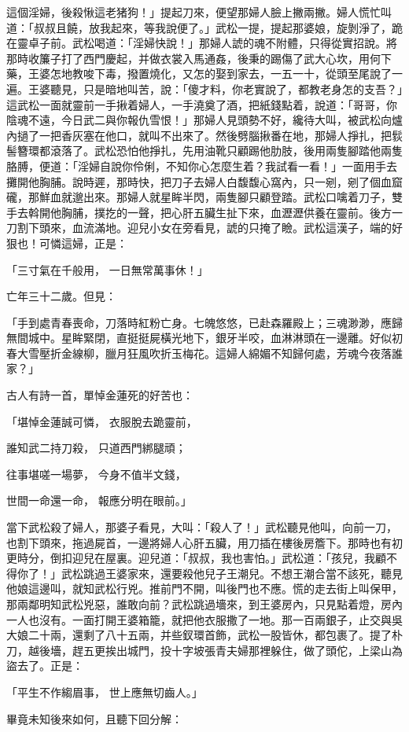 這個淫婦，後殺愀這老猪狗！」提起刀來，便望那婦人臉上撇兩撇。婦人慌忙叫道：「叔叔且饒，放我起來，等我說便了。」武松一提，提起那婆娘，旋剝淨了，跪在靈卓子前。武松喝道：「淫婦快說！」那婦人諕的魂不附體，只得從實招說。將那時收簾子打了西門慶起，并做衣裳入馬通姦，後秉的踢傷了武大心坎，用何下藥，王婆怎地教唆下毒，撥置燒化，又怎的娶到家去，一五一十，從頭至尾說了一遍。王婆聽見，只是暗地叫苦，說：「傻才料，你老實說了，都教老身怎的支吾？」這武松一面就靈前一手揪着婦人，一手澆奠了酒，把紙錢點着，說道：「哥哥，你陰魂不遠，今日武二與你報仇雪恨！」那婦人見頭勢不好，纔待大叫，被武松向爐內撾了一把香灰塞在他口，就叫不出來了。然後劈腦揪番在地，那婦人掙扎，把䯼髻簪環都滾落了。武松恐怕他掙扎，先用油靴只顧踢他肋肢，後用兩隻腳踏他兩隻胳膊，便道：「淫婦自說你伶俐，不知你心怎麼生着？我試看一看！」一面用手去攤開他胸脯。說時遲，那時快，把刀子去婦人白馥馥心窩內，只一剜，剜了個血窟礲，那鮮血就邈出來。那婦人就星眸半閃，兩隻腳只顧登踏。武松口噙着刀子，雙手去斡開他胸脯，撲扢的一聲，把心肝五臟生扯下來，血瀝瀝供養在靈前。後方一刀割下頭來，血流滿地。迎兒小女在旁看見，諕的只掩了瞼。武松這漢子，端的好狠也！可憐這婦，正是：

「三寸氣在千般用，  一日無常萬事休！」

亡年三十二歲。但見：

「手到處青春喪命，刀落時紅粉亡身。七魄悠悠，已赴森羅殿上；三魂渺渺，應歸無間城中。星眸緊閉，直挺挺屍橫光地下，銀牙半咬，血淋淋頭在一邊離。好似初春大雪壓折金線柳，臘月狂風吹折玉梅花。這婦人綿媚不知歸何處，芳魂今夜落誰家？」

古人有詩一首，單悼金蓮死的好苦也：

「堪悼金蓮誠可憐，  衣服脫去跪靈前，

誰知武二持刀殺，  只道西門綁腿頑；

往事堪嗟一場夢，  今身不值半文錢，

世間一命還一命，  報應分明在眼前。」

當下武松殺了婦人，那婆子看見，大叫：「殺人了！」武松聽見他叫，向前一刀，也割下頭來，拖過屍首，一邊將婦人心肝五臟，用刀插在樓後房簷下。那時也有初更時分，倒扣迎兒在屋裏。迎兒道：「叔叔，我也害怕。」武松道：「孩兒，我顧不得你了！」武松跳過王婆家來，還要殺他兒子王潮兒。不想王潮合當不該死，聽見他娘這邊叫，就知武松行兇。推前門不開，叫後門也不應。慌的走去街上叫保甲，那兩鄰明知武松兇惡，誰敢向前？武松跳過墻來，到王婆房內，只見點着燈，房內一人也沒有。一面打開王婆箱籠，就把他衣服撒了一地。那一百兩銀子，止交與吳大娘二十兩，還剩了八十五兩，并些釵環首飾，武松一股皆休，都包裹了。提了朴刀，越後墻，趕五更挨出城門，投十字坡張青夫婦那裡躲住，做了頭佗，上梁山為盜去了。正是：

「平生不作縐眉事，  世上應無切齒人。」

畢竟未知後來如何，且聽下回分解：

